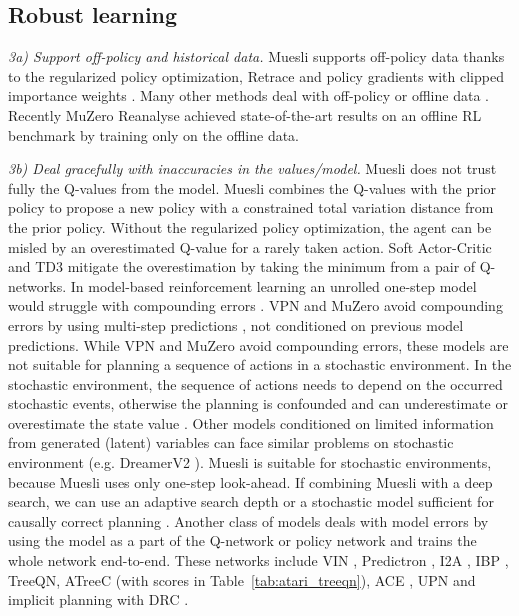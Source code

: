 \documentclass{article}
\begin{document}
\subsection{Robust learning}
\textit{3a) Support off-policy and historical data.} Muesli supports off-policy data thanks to the regularized policy optimization, Retrace \citep{munos2016safe} and policy gradients with clipped importance weights \citep{gruslys2018reactor}. Many other methods deal with off-policy or offline data \citep{levine2020offline}. Recently MuZero Reanalyse \citep{schrittwieser2021offline} achieved state-of-the-art results on an offline RL benchmark by training only on the offline data.

\textit{3b) Deal gracefully with inaccuracies in the values/model.} Muesli does not trust fully the Q-values from the model. Muesli combines the Q-values with the prior policy to propose a new policy with a constrained total variation distance from the prior policy. Without the regularized policy optimization, the agent can be misled by an overestimated Q-value for a rarely taken action. Soft Actor-Critic \citep{haarnoja2018sac} and TD3 \citep{fujimoto2018addressing} mitigate the overestimation by taking the minimum from a pair of Q-networks. In model-based reinforcement learning an unrolled one-step model would struggle with compounding errors \citep{janner2019trustmodel}. VPN \citep{oh2017vpn} and MuZero \citep{schrittwieser2019} avoid compounding errors by using multi-step predictions , not conditioned on previous model predictions. While VPN and MuZero avoid compounding errors, these models are not suitable for planning a sequence of actions in a stochastic environment. In the stochastic environment, the sequence of actions needs to depend on the occurred stochastic events, otherwise the planning is confounded and can underestimate or overestimate the state value \citep{rezende2020causalmodelsrl}.
Other models conditioned on limited information from generated (latent) variables can face similar problems on stochastic environment (e.g. DreamerV2 \citep{hafner2020dreamerv2}). Muesli is suitable for stochastic environments, because Muesli uses only one-step look-ahead. If combining Muesli with a deep search, we can use an adaptive search depth or a stochastic model sufficient for causally correct planning \citep{rezende2020causalmodelsrl}. Another class of models deals with model errors by using the model as a part of the Q-network or policy network and trains the whole network end-to-end. These networks include VIN \citep{tamar2016vin}, Predictron \citep{silver2017predictron}, I2A \citep{racaniere2017i2a}, IBP \citep{pascanu2017ibp}, TreeQN, ATreeC \citep{farquhar2018treeqn} (with scores in Table~\ref{tab:atari_treeqn}), ACE \citep{zhang2019ace}, UPN \citep{srinivas2018universal} and implicit planning with DRC \citep{guez2019investigation}.
\end{document}

